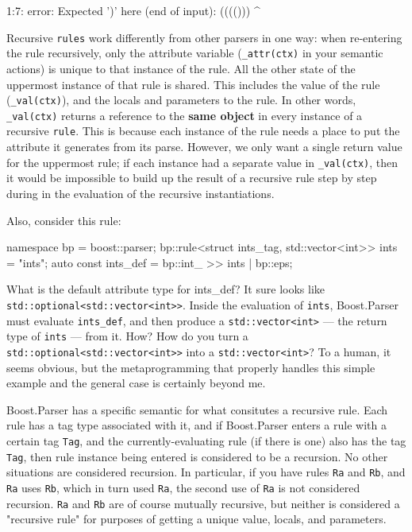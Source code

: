\begin{code}
1:7: error: Expected ')' here (end of input):
(((()))
       ^
\end{code}

Recursive \texttt{rules} work differently from other parsers in one way: when re-entering the rule recursively, only the attribute variable (\texttt{\_attr(ctx)} in your semantic actions) is unique to that instance of the rule. All the other state of the uppermost instance of that rule is shared. This includes the value of the rule (\texttt{\_val(ctx)}), and the locals and parameters to the rule. In other words, \texttt{\_val(ctx)} returns a reference to the \textbf{same object} in every instance of a recursive \texttt{rule}. This is because each instance of the rule needs a place to put the attribute it generates from its parse. However, we only want a single return value for the uppermost rule; if each instance had a separate value in \texttt{\_val(ctx)}, then it would be impossible to build up the result of a recursive rule step by step during in the evaluation of the recursive instantiations.

Also, consider this rule:

\begin{code}
namespace bp = boost::parser;
bp::rule<struct ints_tag, std::vector<int>> ints = "ints";
auto const ints_def = bp::int_ >> ints | bp::eps;
\end{code}

What is the default attribute type for ints\_def? It sure looks like \texttt{std::optional<std::vector<int>>}. Inside the evaluation of \texttt{ints}, Boost.Parser must evaluate \texttt{ints\_def}, and then produce a \texttt{std::vector<int>} --- the return type of \texttt{ints} --- from it. How? How do you turn a \texttt{std::optional<std::vector<int>>} into a \texttt{std::vector<int>}? To a human, it seems obvious, but the metaprogramming that properly handles this simple example and the general case is certainly beyond me.

Boost.Parser has a specific semantic for what consitutes a recursive rule. Each rule has a tag type associated with it, and if Boost.Parser enters a rule with a certain tag \texttt{Tag}, and the currently-evaluating rule (if there is one) also has the tag \texttt{Tag}, then rule instance being entered is considered to be a recursion. No other situations are considered recursion. In particular, if you have rules \texttt{Ra} and \texttt{Rb}, and \texttt{Ra} uses \texttt{Rb}, which in turn used \texttt{Ra}, the second use of \texttt{Ra} is not considered recursion. \texttt{Ra} and \texttt{Rb} are of course mutually recursive, but neither is considered a "recursive rule" for purposes of getting a unique value, locals, and parameters.

